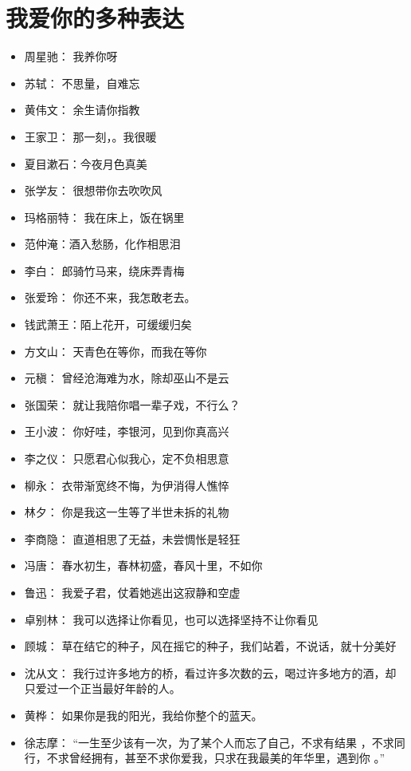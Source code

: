 \documentclass[UTF8,a4paper,8pt]{ctexart}
\begin{document}
 \section{我爱你的多种表达}
 \begin{itemize}
 	\item 周星驰： 我养你呀
 	\item 苏轼： 不思量，自难忘
 	\item 黄伟文： 余生请你指教
 	\item 王家卫： 那一刻，。我很暖
 	\item 夏目漱石：今夜月色真美
 	\item 张学友： 很想带你去吹吹风
 	\item 玛格丽特： 我在床上，饭在锅里
 	\item 范仲淹：酒入愁肠，化作相思泪
 	\item 李白： 郎骑竹马来，绕床弄青梅
 	\item 张爱玲： 你还不来，我怎敢老去。
 	\item 钱武萧王：陌上花开，可缓缓归矣
 	\item 方文山： 天青色在等你，而我在等你
 	\item 元稹： 曾经沧海难为水，除却巫山不是云
 	\item 张国荣： 就让我陪你唱一辈子戏，不行么？
 	\item 王小波： 你好哇，李银河，见到你真高兴
 	\item 李之仪： 只愿君心似我心，定不负相思意
 	\item 柳永： 衣带渐宽终不悔，为伊消得人憔悴
 	\item 林夕： 你是我这一生等了半世未拆的礼物
 	\item 李商隐： 直道相思了无益，未尝惆怅是轻狂
 	\item 冯唐： 春水初生，春林初盛，春风十里，不如你
 	\item 鲁迅： 我爱子君，仗着她逃出这寂静和空虚
 	\item 卓别林： 我可以选择让你看见，也可以选择坚持不让你看见
 	\item 顾城： 草在结它的种子，风在摇它的种子，我们站着，不说话，就十分美好
 	\item 沈从文： 我行过许多地方的桥，看过许多次数的云，喝过许多地方的酒，却只爱过一个正当最好年龄的人。
 	\item 黄桦： 如果你是我的阳光，我给你整个的蓝天。
 	\item 徐志摩： “一生至少该有一次，为了某个人而忘了自己，不求有结果 ，不求同行，不求曾经拥有，甚至不求你爱我，只求在我最美的年华里，遇到你 。”
 \end{itemize}
 
\end{document}
